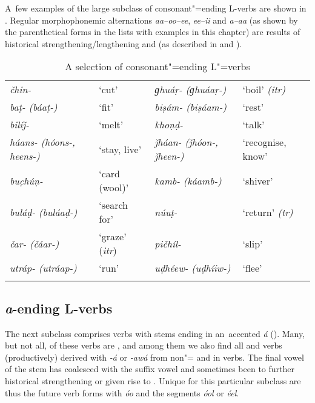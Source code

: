 \largerpage
A~few examples of the large subclass of consonant"=ending L-verbs are shown in . Regular morphophonemic alternations \textit{aa--oo--ee}, \textit{ee--ii} and \textit{a--aa} (as shown by the parenthetical forms in the lists with examples in this chapter) are results of historical strengthening/lengthening and  (as described in  and ). 


\begin{table}
\caption{A selection of consonant"=ending L"=verbs}
\begin{tabularx}{\textwidth}{ Q Q Q Q }
\lsptoprule
\textit{čhin-} &
`cut' &
\textit{ɡhuáṛ- (ɡhuáaṛ-)} &
`boil' \textit{(itr)}\\
\textit{baṭ- (báaṭ-)} &
`fit' &
\textit{biṣám- (biṣáam-)} &
`rest'\\
\textit{bilíǰ-} &
`melt' &
\textit{khoṇḍ-} &
`talk'\\
\textit{háans- (hóons-, heens-)} &
`stay, live'
&
\textit{ǰháan- (ǰhóon-, ǰheen-)} &
`recognise, know'\\
\textit{buc̣húṇ-} &
`card (wool)' &
\textit{kamb- (káamb-)} &
`shiver'\\
\textit{buláḍ- (buláaḍ-)} &
`search for' &
\textit{núuṭ-} &
`return' \textit{(tr)}\\
\textit{čar- (čáar-)} &
`graze' (\textit{itr}) &
\textit{pičhíl-} &
`slip'\\
\textit{utráp- (utráap-)} &
`run' &
\textit{uḍhéew- (uḍhíiw-)} &
`flee'\\\lspbottomrule
\end{tabularx}
\label{tab:8-lc}
\end{table}


\subsection{\textit{a}-ending L-verbs}
\label{subsec:8-3-2}

\largerpage[-1]
The next subclass comprises verbs with stems ending in an~accented \textit{á} (). Many, but not all, of these verbs are , and among them we also find all  and  verbs (productively) derived with \textit{-á} or \textit{-awá} from non"= and in verbs. The final vowel of the stem has coalesced with the suffix vowel and sometimes been  to further historical strengthening or given rise to . Unique for this particular subclass are thus the future verb forms with \textit{óo} and the  segments \textit{óol} or \textit{éel}. 


